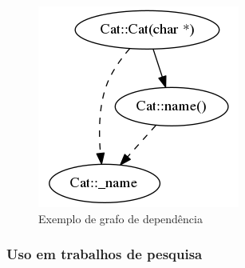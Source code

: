 \begin{itemize}
\begin{figure}[h]
\center
\includegraphics[scale=0.4]{imagens/sample-graph.png}
\caption{Exemplo de grafo de dependência}
\label{sample-graph}
\end{figure}


\end{itemize}

\subsubsection{Uso em trabalhos de pesquisa}
\label{trabalhos-analizo}

